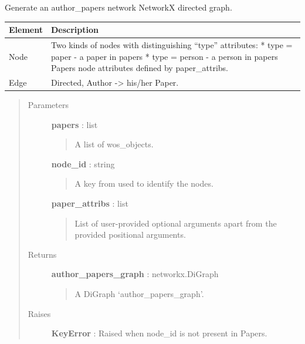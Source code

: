 \documentclass[letterpaper,10pt,english]{sphinxmanual}
\begin{document}

\begin{fulllineitems}
\label{tethne.networks:tethne.networks.authors.author_papers}
Generate an author\_papers network NetworkX directed graph.

\begin{tabulary}{\linewidth}{|L|L|}
\hline
\textbf{
Element
} & \textbf{
Description
}\\\hline

Node
 & 
Two kinds of nodes with distinguishing ``type'' attributes:
* type = paper    - a paper in papers
* type = person   - a person in papers
Papers node attributes defined by paper\_attribs.
\\\hline

Edge
 & 
Directed, Author -\textgreater{} his/her Paper.
\\\hline
\end{tabulary}

\begin{quote}\begin{description}
\item[{Parameters }] \leavevmode
\textbf{papers} : list
\begin{quote}

A list of wos\_objects.
\end{quote}

\textbf{node\_id} : string
\begin{quote}

A key from {\hyperref[tethne:tethne.data.Paper]{}} used to identify the nodes.
\end{quote}

\textbf{paper\_attribs} : list
\begin{quote}

List of user-provided optional arguments apart from the provided
positional arguments.
\end{quote}

\item[{Returns }] \leavevmode
\textbf{author\_papers\_graph} : networkx.DiGraph
\begin{quote}

A DiGraph `author\_papers\_graph'.
\end{quote}

\item[{Raises }] \leavevmode
\textbf{KeyError} : Raised when node\_id is not present in Papers.

\end{description}\end{quote}

\end{fulllineitems}
\end{document}
